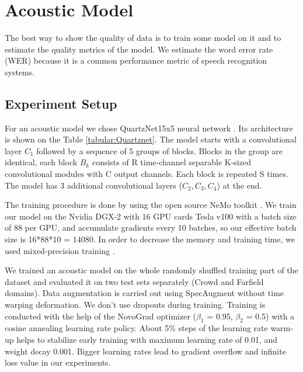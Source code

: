 \documentclass[a4paper]{article}
\begin{document}
\section{Acoustic Model}

The best way to show the quality of data is to train some model on it and to estimate the quality metrics of the model. We estimate the word error rate (WER) because it is a common performance metric of speech recognition systems.  

\subsection{Experiment Setup}

For an acoustic model we chose QuartzNet15x5 neural network \cite{kriman2020quartznet}. Its architecture is shown on the Table \ref{tabular:Quartznet}. The model starts with a convolutional layer $C_1$ followed by a sequence of 5 groups of blocks. Blocks in the group are identical, each block $B_k$ consists of R time-channel separable K-sized convolutional modules with C output channels. Each block is repeated S times. The model has 3 additional convolutional layers ($C_2, C_3, C_4$) at the end.

The training procedure is done by using the open source NeMo toolkit \cite{kuchaiev2019nemo}. We train our model on the Nvidia DGX-2 with 16 GPU cards Tesla v100 with a batch size of 88 per GPU, and accumulate gradients every 10 batches, so our effective batch size is 16*88*10 = 14080. In order to decrease the memory and training time, we used mixed-precision training \cite{micikevicius2017mixed}.

We trained an acoustic model on the whole randomly shuffled training part of the dataset and evaluated it on two test sets separately (Crowd and Farfield domains). Data augmentation is carried out using SpecAugment \cite{park2019specaugment} without time warping deformation. We don't use dropouts during training. Training is conducted with the help of the NovoGrad \cite{ginsburg2019stochastic} optimizer ($\beta_1$ = 0.95, $\beta_2$ = 0.5) with a cosine annealing learning rate policy. About 5\% steps of the learning rate warm-up helps to stabilize early training with maximum learning rate of 0.01, and weight decay 0.001. Bigger learning rates lead to gradient overflow and infinite loss value in our experiments. 
\end{document}
